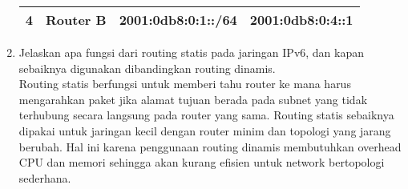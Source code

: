 \begin{enumerate}
\begin{table}[H]
\begin{tabular}{|c|c|c|c|}
				4 & Router B & 2001:0db8:0:1::/64 & 2001:0db8:0:4::1 \\ \hline
			\end{tabular}
		\end{table}
	\item Jelaskan apa fungsi dari routing statis pada jaringan IPv6, dan kapan sebaiknya digunakan dibandingkan routing dinamis.\\
	Routing statis berfungsi untuk memberi tahu router ke mana harus mengarahkan paket jika alamat tujuan berada pada subnet yang tidak terhubung secara langsung pada router yang sama. Routing statis sebaiknya dipakai untuk jaringan kecil dengan router minim dan topologi yang jarang berubah. Hal ini karena penggunaan routing dinamis membutuhkan overhead CPU dan memori sehingga akan kurang efisien untuk network bertopologi sederhana.
\end{enumerate}